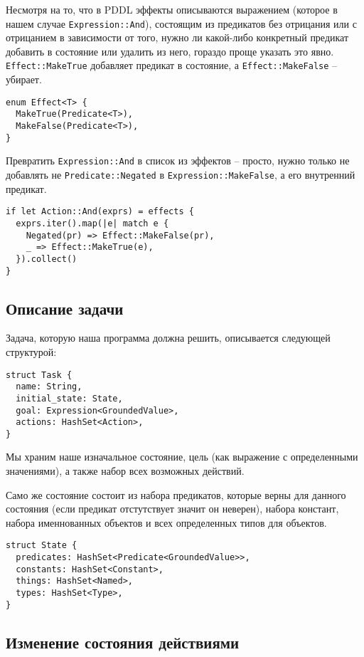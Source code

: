 \documentclass{article}
\begin{document}
Несмотря на то, что в PDDL эффекты описываются выражением (которое в нашем случае \texttt{Expression::And}),
состоящим из предикатов без отрицания или с отрицанием в зависимости от того,
нужно ли какой-либо конкретный предикат добавить в состояние или удалить из него,
гораздо проще указать это явно.
\texttt{Effect::MakeTrue} добавляет предикат в состояние,
а \texttt{Effect::MakeFalse} -- убирает.

\begin{verbatim}
enum Effect<T> {
  MakeTrue(Predicate<T>),
  MakeFalse(Predicate<T>),
}
\end{verbatim}

Превратить \texttt{Expression::And} в список из эффектов -- просто,
нужно только не добавлять не \texttt{Predicate::Negated} в \texttt{Expression::MakeFalse},
а его внутренний предикат.

\begin{verbatim}
if let Action::And(exprs) = effects {
  exprs.iter().map(|e| match e {
    Negated(pr) => Effect::MakeFalse(pr),
    _ => Effect::MakeTrue(e),
  }).collect()
}
\end{verbatim}

\subsection{Описание задачи}

Задача, которую наша программа должна решить, описывается следующей структурой:

\begin{verbatim}
struct Task {
  name: String,
  initial_state: State,
  goal: Expression<GroundedValue>,
  actions: HashSet<Action>,
}
\end{verbatim}

Мы храним наше изначальное состояние, цель (как выражение с определенными значениями),
а также набор всех возможных действий.

Само же состояние состоит из набора предикатов, которые верны для данного состояния
(если предикат отстутствует значит он неверен), набора констант, набора именнованных объектов
и всех определенных типов для объектов.

\begin{verbatim}
struct State {
  predicates: HashSet<Predicate<GroundedValue>>,
  constants: HashSet<Constant>,
  things: HashSet<Named>,
  types: HashSet<Type>,
}
\end{verbatim}

\subsection{Изменение состояния действиями}
\end{document}
